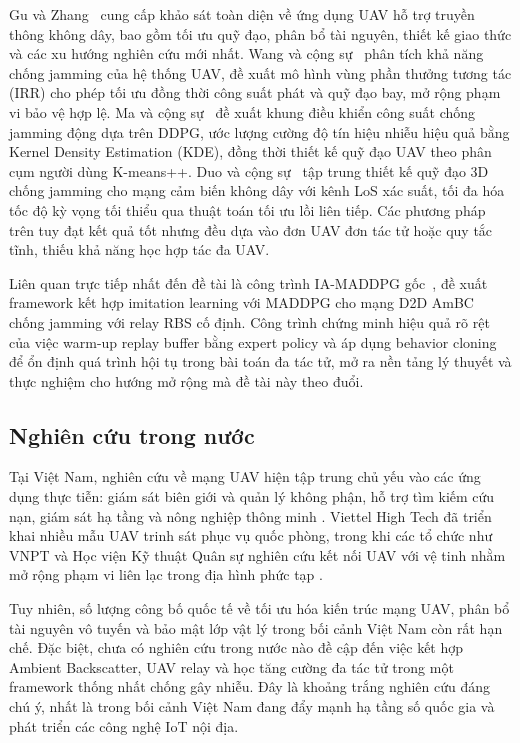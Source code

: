Gu và Zhang~\cite{gu2023uav} cung cấp khảo sát toàn diện về ứng dụng UAV hỗ trợ truyền
thông không dây, bao gồm tối ưu quỹ đạo, phân bổ tài nguyên, thiết kế giao thức và các xu
hướng nghiên cứu mới nhất. Wang và cộng sự~\cite{wang2023uavjamming} phân tích khả năng
chống jamming của hệ thống UAV, đề xuất mô hình vùng phần thưởng tương tác (IRR) cho phép
tối ưu đồng thời công suất phát và quỹ đạo bay, mở rộng phạm vi bảo vệ hợp lệ. Ma và cộng
sự~\cite{ma2022rl} đề xuất khung điều khiển công suất chống jamming động dựa trên DDPG, ước
lượng cường độ tín hiệu nhiễu hiệu quả bằng Kernel Density Estimation (KDE), đồng thời thiết
kế quỹ đạo UAV theo phân cụm người dùng K-means++. Duo và cộng sự~\cite{duo2020antijamming3d}
tập trung thiết kế quỹ đạo 3D chống jamming cho mạng cảm biến không dây với kênh LoS xác
suất, tối đa hóa tốc độ kỳ vọng tối thiểu qua thuật toán tối ưu lồi liên tiếp. Các phương
pháp trên tuy đạt kết quả tốt nhưng đều dựa vào đơn UAV đơn tác tử hoặc quy tắc tĩnh, thiếu
khả năng học hợp tác đa UAV.

Liên quan trực tiếp nhất đến đề tài là công trình IA-MADDPG gốc~\cite{iamaddpg2024}, đề xuất
framework kết hợp imitation learning với MADDPG cho mạng D2D AmBC chống jamming với relay
RBS cố định. Công trình chứng minh hiệu quả rõ rệt của việc warm-up replay buffer bằng expert
policy và áp dụng behavior cloning để ổn định quá trình hội tụ trong bài toán đa tác tử, mở
ra nền tảng lý thuyết và thực nghiệm cho hướng mở rộng mà đề tài này theo đuổi.

\subsection{Nghiên cứu trong nước}
\label{subsec:intro:sota:vietnam}

Tại Việt Nam, nghiên cứu về mạng UAV hiện tập trung chủ yếu vào các ứng dụng thực tiễn:
giám sát biên giới và quản lý không phận, hỗ trợ tìm kiếm cứu nạn, giám sát hạ tầng và
nông nghiệp thông minh \cite{hang2023uav, vohoa2023uav}. Viettel High Tech đã triển khai
nhiều mẫu UAV trinh sát phục vụ quốc phòng, trong khi các tổ chức như VNPT và Học viện Kỹ
thuật Quân sự nghiên cứu kết nối UAV với vệ tinh nhằm mở rộng phạm vi liên lạc trong địa
hình phức tạp \cite{viettel2025uav}.

Tuy nhiên, số lượng công bố quốc tế về tối ưu hóa kiến trúc mạng UAV, phân bổ tài nguyên
vô tuyến và bảo mật lớp vật lý trong bối cảnh Việt Nam còn rất hạn chế. Đặc biệt, chưa có
nghiên cứu trong nước nào đề cập đến việc kết hợp Ambient Backscatter, UAV relay và học
tăng cường đa tác tử trong một framework thống nhất chống gây nhiễu. Đây là khoảng trắng
nghiên cứu đáng chú ý, nhất là trong bối cảnh Việt Nam đang đẩy mạnh hạ tầng số quốc gia
và phát triển các công nghệ IoT nội địa.


